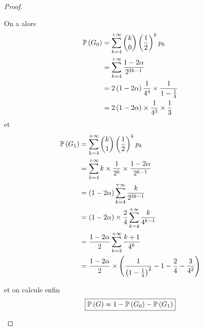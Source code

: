 \begin{proof}
\begin{enumerate}
        On a alors 
        \begin{align}
            \P\left(G_{0}\right)
            &=\sum_{k=4}^{+\infty}\binom{k}{0}\left(\frac{1}{2}\right)^{k}p_{k}\\
            &=\sum_{k=4}^{+\infty}\frac{1-2\alpha}{2^{2k-1}}\\
            &=2\left(1-2\alpha\right)\frac{1}{4^{4}}\times\frac{1}{1-\frac{1}{4}}\\
            &=2\left(1-2\alpha\right)\times\frac{1}{4^{3}}\times\frac{1}{3}
        \end{align}
        et 
        \begin{align}
            \P\left(G_{1}\right)
            &=\sum_{k=4}^{+\infty}\binom{k}{1}\left(\frac{1}{2}\right)^{k}p_{k}\\
            &=\sum_{k=4}^{+\infty}k\times\frac{1}{2^{k}}\times\frac{1-2\alpha}{2^{k-1}}\\
            &=\left(1-2\alpha\right)\sum_{k=4}^{+\infty}\frac{k}{2^{2k-1}}\\
            &=\left(1-2\alpha\right)\times\frac{2}{4}\sum_{k=4}^{+\infty}\frac{k}{4^{k-1}}\\
            &=\frac{1-2\alpha}{2}\sum_{k=3}^{+\infty}\frac{k+1}{4^{k}}\\
            &=\frac{1-2\alpha}{2}\times\left(\frac{1}{\left(1-\frac{1}{4}\right)^{2}}-1-\frac{2}{4}-\frac{3}{4^{2}}\right)
        \end{align}

        et on calcule enfin 
        \begin{equation}
            \boxed{\P\left(G\right)=1-\P\left(G_{0}\right)-\P\left(G_{1}\right)}
        \end{equation}
    \end{enumerate}
\end{proof}

